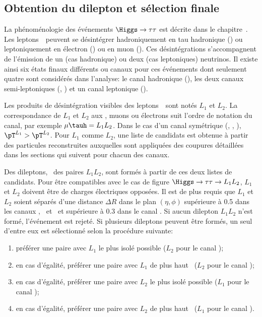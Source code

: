 \subsection{Obtention du dilepton et sélection finale}\label{chapter-HTT_analysis-section-offline_selection}
La phénoménologie des événements $\Higgs\to\tau\tau$ est décrite dans le chapitre~.
Les leptons~\tau\ peuvent se désintégrer hadroniquement en tau hadronique (\tauh) ou leptoniquement en électron (\ele) ou en muon (\mu).
Ces désintégrations s'accompagnent de l'émission de un (cas hadronique) ou deux (cas leptoniques) neutrinos.
Il existe ainsi six états finaux différents ou canaux pour ces événements dont seulement quatre sont considérés dans l'analyse:
le canal hadronique (\tauh\tauh),
les deux canaux semi-leptoniques (\mu\tauh, \ele\tauh)
et un canal leptonique (\ele\mu).
\par
Les produits de désintégration visibles des leptons~\tau\ sont notés $L_1$ et $L_2$.
La correspondance de $L_1$ et $L_2$ aux \tauh, muons ou électrons suit l'ordre de notation du canal, par exemple $\mu\tauh=L_1L_2$.
Dans le cas d'un canal symétrique (\tauh\tauh, \mu\mu, \ele\ele), $\pT^{L_1}>\pT^{L_2}$.
Pour $L_1$ comme $L_2$, une liste de candidats est obtenue à partir des particules reconstruites auxquelles sont appliquées des coupures détaillées dans les sections qui suivent pour chacun des canaux.
\par
Des dileptons, \ie\ des paires $L_1L_2$,
sont formés
à partir de ces deux listes de candidats.
Pour être compatibles avec le cas de figure $\Higgs\to\tau\tau\to L_1L_2$,
$L_1$ et $L_2$ doivent être de charges électriques opposées.
Il est de plus requis que $L_1$ et $L_2$ soient séparés d'une distance $\Delta R$ dans le plan $(\eta,\phi)$ 
supérieure à \num{0.5} dans les canaux \tauh\tauh, \mu\tauh\ et \ele\tauh\
et
supérieure à \num{0.3} dans le canal \ele\mu.
Si aucun dilepton $L_1L_2$ n'est formé, l'événement est rejeté.
Si plusieurs dileptons peuvent être formés,
un seul d'entre eux est sélectionné selon la procédure suivante:
\begin{enumerate}
    \item préférer une paire avec $L_1$ le plus isolé possible ($L_2$ pour le canal \ele\mu);
    \item en cas d'égalité, préférer une paire avec $L_1$ de plus haut \pT\ ($L_2$ pour le canal \ele\mu);
    \item en cas d'égalité, préférer une paire avec $L_2$ le plus isolé possible ($L_1$ pour le canal \ele\mu);
    \item en cas d'égalité, préférer une paire avec $L_2$ de plus haut \pT\ ($L_1$ pour le canal \ele\mu).
\end{enumerate}
